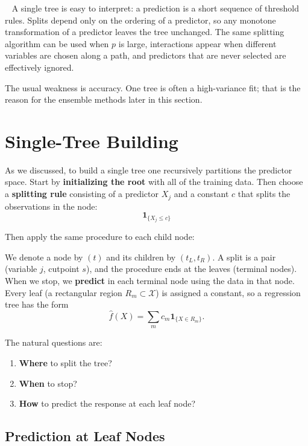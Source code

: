 \documentclass[
]{book}
\providecommand{\tightlist}{%
  \setlength{\itemsep}{0pt}\setlength{\parskip}{0pt}}
\begin{document}
~
A single tree is easy to interpret: a prediction is a short sequence of threshold rules. Splits depend only on the ordering of a predictor, so any monotone transformation of a predictor leaves the tree unchanged. The same splitting algorithm can be used when \(p\) is large, interactions appear when different variables are chosen along a path, and predictors that are never selected are effectively ignored.

The usual weakness is accuracy. One tree is often a high-variance fit; that is the reason for the ensemble methods later in this section.

\section{Single-Tree Building}\label{single-tree-building}

As we discussed, to build a single tree one recursively partitions the predictor space. Start by \textbf{initializing the root} with all of the training data. Then choose a \textbf{splitting rule} consisting of a predictor \(X_j\) and a constant \(c\) that splits the observations in the node:
\[\mathbf{1}_{\{X_j \leq c\}}\]

Then apply the same procedure to each child node:

We denote a node by \((t)\) and its children by \((t_L, t_R)\). A split is a pair (variable \(j\), cutpoint \(s\)), and the procedure ends at the leaves (terminal nodes).
When we stop, we \textbf{predict} in each terminal node using the data in that node. Every leaf (a rectangular region \(R_m \subset \mathcal{X}\)) is assigned a constant, so a regression tree has the form
\[\hat{f}(X) = \sum_m c_m \mathbf{1}_{\{X \in R_m\}}.\]

The natural questions are:

\begin{enumerate}
\def\labelenumi{\arabic{enumi}.}
\tightlist
\item
  \textbf{Where} to split the tree?~
\item
  \textbf{When} to stop? ~
\item
  \textbf{How} to predict the response at each leaf node?
\end{enumerate}

\subsection{Prediction at Leaf Nodes}\label{prediction-at-leaf-nodes}
\end{document}

